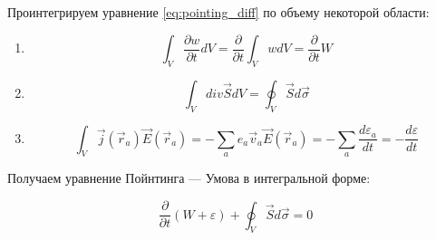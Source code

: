 \documentclass{article}
\begin{document}
Проинтегрируем уравнение \eqref{eq:pointing_diff} по объему некоторой области:

\begin{enumerate}
    \item 
    \begin{equation*}
        \int_V\frac{\partial w}{\partial t}dV=\frac{\partial}{\partial t}\int_V wdV=\frac{\partial}{\partial t}W
    \end{equation*}
    \item
    \begin{equation*}
        \int_V div\vec{S}dV=\oint_V \vec{S}d\vec{\sigma}
    \end{equation*}
    \item
    \begin{equation*}
        \int_V \vec{j}(\vec{r}_a)\vec{E}(\vec{r}_a)=-\sum_a e_a \vec{v}_a \vec{E}(\vec{r}_a)=-\sum_a\frac{d\varepsilon_a}{dt}=-\frac{d\varepsilon}{dt}
    \end{equation*}
\end{enumerate}

Получаем уравнение Пойнтинга --- Умова в интегральной форме:

\begin{equation}\label{eq:pointing_int}
    \frac{\partial}{\partial t}\left(W+\varepsilon\right)+\oint_V \vec{S}d\vec{\sigma}=0
\end{equation}
\end{document}

